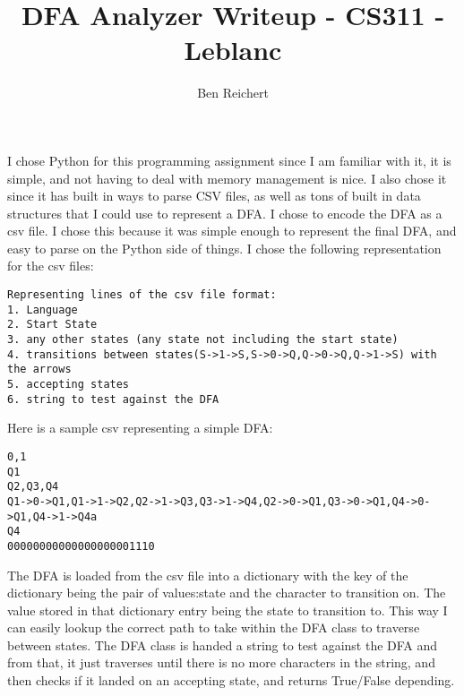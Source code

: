 \documentclass{article}
\begin{document}
\title{DFA Analyzer Writeup - CS311 - Leblanc}
\author{Ben Reichert}

\maketitle



I chose Python for this programming assignment since I am familiar with it, it is simple, and not having to deal with memory management is nice. I also chose it since it has built in ways to parse CSV files, as well as tons of built in data structures that I could use to represent a DFA. I chose to encode the DFA as a csv file. I chose this because it was simple enough to represent the final DFA, and easy to parse on the Python side of things. I chose the following representation for the csv files:

\begin{lstlisting}
Representing lines of the csv file format:
1. Language
2. Start State
3. any other states (any state not including the start state)
4. transitions between states(S->1->S,S->0->Q,Q->0->Q,Q->1->S) with the arrows
5. accepting states
6. string to test against the DFA
\end{lstlisting}

Here is a sample csv representing a simple DFA:

\begin{lstlisting}
0,1
Q1
Q2,Q3,Q4
Q1->0->Q1,Q1->1->Q2,Q2->1->Q3,Q3->1->Q4,Q2->0->Q1,Q3->0->Q1,Q4->0->Q1,Q4->1->Q4a
Q4
00000000000000000001110
\end{lstlisting}

The DFA is loaded from the csv file into a dictionary with the key of the dictionary being the pair of values:state and the character to transition on. The value stored in that dictionary entry being the state to transition to. This way I can easily lookup the correct path to take within the DFA class to traverse between states. The DFA class is handed a string to test against the DFA and from that, it just traverses until there is no more characters in the string, and then checks if it landed on an accepting state, and returns True/False depending.
\end{document}
